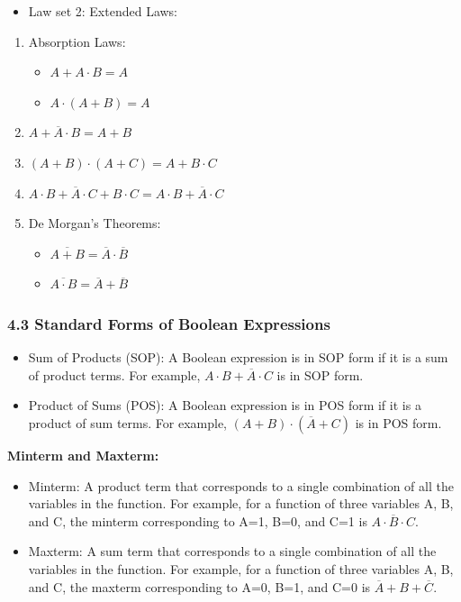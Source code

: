 \documentclass[
  a4paper,
]{article}
\providecommand{\tightlist}{%
  \setlength{\itemsep}{0pt}\setlength{\parskip}{0pt}}
\begin{document}
\begin{itemize}
\tightlist
\item
  Law set 2: Extended Laws:
\end{itemize}

\begin{enumerate}
\def\labelenumi{\arabic{enumi}.}
\tightlist
\item
  Absorption Laws:

  \begin{itemize}
  \tightlist
  \item
    \(A + A \cdot B = A\)
  \item
    \(A \cdot (A + B) = A\)
  \end{itemize}
\item
  \(A+\overline{A} \cdot B = A + B\)
\item
  \((A + B) \cdot (A + C) = A + B \cdot C\)
\item
  \(A \cdot B + \overline{A} \cdot C + B \cdot C = A \cdot B + \overline{A} \cdot C\)
\item
  De Morgan's Theorems:

  \begin{itemize}
  \tightlist
  \item
    \(\overline{A + B} = \overline{A} \cdot \overline{B}\)
  \item
    \(\overline{A \cdot B} = \overline{A} + \overline{B}\)
  \end{itemize}
\end{enumerate}

\subsubsection{4.3 Standard Forms of Boolean
Expressions}\label{standard-forms-of-boolean-expressions}

\begin{itemize}
\tightlist
\item
  Sum of Products (SOP): A Boolean expression is in SOP form if it is a
  sum of product terms. For example,
  \(A \cdot B + \overline{A} \cdot C\) is in SOP form.
\item
  Product of Sums (POS): A Boolean expression is in POS form if it is a
  product of sum terms. For example,
  \((A + B) \cdot (\overline{A} + C)\) is in POS form.
\end{itemize}

\textbf{Minterm and Maxterm:}

\begin{itemize}
\tightlist
\item
  Minterm: A product term that corresponds to a single combination of
  all the variables in the function. For example, for a function of
  three variables A, B, and C, the minterm corresponding to A=1, B=0,
  and C=1 is \(A \cdot \overline{B} \cdot C\).
\item
  Maxterm: A sum term that corresponds to a single combination of all
  the variables in the function. For example, for a function of three
  variables A, B, and C, the maxterm corresponding to A=0, B=1, and C=0
  is \(\overline{A} + B + \overline{C}\).
\end{itemize}
\end{document}
